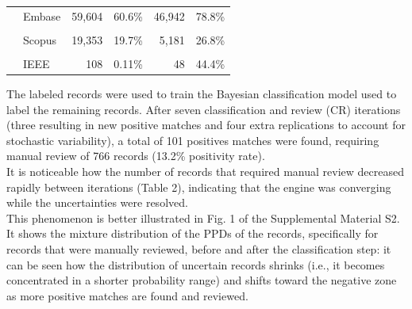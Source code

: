 \documentclass{article}
\begin{document}
\begin{table}[!h]
{\begin{tabular}[t]{llrlrl}
 & Embase & 59,604 & 60.6\% & 46,942 & 78.8\%\\
\cellcolor{gray!6}{} & \cellcolor{gray!6}{Pubmed} & \cellcolor{gray!6}{37,278} & \cellcolor{gray!6}{37.9\%} & \cellcolor{gray!6}{21,371} & \cellcolor{gray!6}{57.3\%}\\
\addlinespace
 & Scopus & 19,353 & 19.7\% & 5,181 & 26.8\%\\
\cellcolor{gray!6}{} & \cellcolor{gray!6}{WOS} & \cellcolor{gray!6}{14,367} & \cellcolor{gray!6}{14.6\%} & \cellcolor{gray!6}{3,175} & \cellcolor{gray!6}{22.1\%}\\
 & IEEE & 108 & 0.11\% & 48 & 44.4\%\\
\bottomrule
\end{tabular}}
\end{table}

The labeled records were used to train the Bayesian classification model
used to label the remaining records. After seven classification and
review (CR) iterations (three resulting in new positive matches and four
extra replications to account for stochastic variability), a total of
101 positives matches were found, requiring manual review of 766 records
(13.2\% positivity rate).\\
It is noticeable how the number of records that required manual review
decreased rapidly between iterations (Table 2), indicating that the
engine was converging while the uncertainties were resolved.\\
This phenomenon is better illustrated in Fig. 1 of the Supplemental
Material S2. It shows the mixture distribution of the PPDs of the
records, specifically for records that were manually reviewed, before
and after the classification step: it can be seen how the distribution
of uncertain records shrinks (i.e., it becomes concentrated in a shorter
probability range) and shifts toward the negative zone as more positive
matches are found and reviewed.
\end{document}
